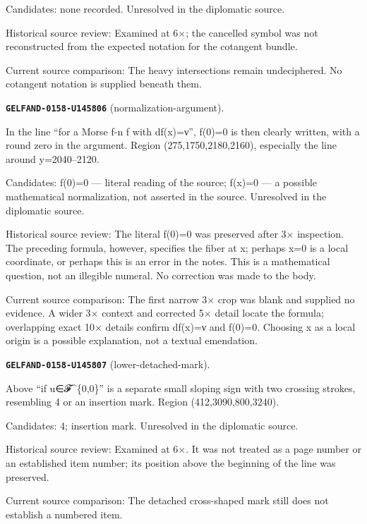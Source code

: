 Candidates: none recorded. Unresolved in the diplomatic source.\par
Historical source review: Examined at 6×; the cancelled symbol was not reconstructed from the expected notation for the cotangent bundle.\par
Current source comparison: The heavy intersections remain undeciphered. No cotangent notation is supplied beneath them.\par\medskip
\par\noindent\leavevmode{}\label{GELFAND-0158-U145806}\label{GELFAND-P001458:normalization-argument}\textbf{\texttt{GELFAND-0158-U145806}} (normalization-argument).\nopagebreak[4]\par
In the line “for a Morse f-n f with df(x)=ν”, f(0)=0 is then clearly written, with a round zero in the argument. Region (275,1750,2180,2160), especially the line around y=2040–2120.\par
Candidates: f(0)=0 — literal reading of the source; f(x)=0 — a possible mathematical normalization, not asserted in the source. Unresolved in the diplomatic source.\par
Historical source review: The literal f(0)=0 was preserved after 3× inspection. The preceding formula, however, specifies the fiber at x; perhaps x=0 is a local coordinate, or perhaps this is an error in the notes. This is a mathematical question, not an illegible numeral. No correction was made to the body.\par
Current source comparison: The first narrow 3× crop was blank and supplied no evidence. A wider 3× context and corrected 5× detail locate the formula; overlapping exact 10× details confirm df(x)=ν and f(0)=0. Choosing x as a local origin is a possible explanation, not a textual emendation.\par\medskip
\par\noindent\leavevmode{}\label{GELFAND-0158-U145807}\label{GELFAND-P001458:lower-detached-mark}\textbf{\texttt{GELFAND-0158-U145807}} (lower-detached-mark).\nopagebreak[4]\par
Above “if u∈𝓕\textasciicircum{}\{0,0\}” is a separate small sloping sign with two crossing strokes, resembling 4 or an insertion mark. Region (412,3090,800,3240).\par
Candidates: 4; insertion mark. Unresolved in the diplomatic source.\par
Historical source review: Examined at 6×. It was not treated as a page number or an established item number; its position above the beginning of the line was preserved.\par
Current source comparison: The detached cross-shaped mark still does not establish a numbered item.\par\medskip
